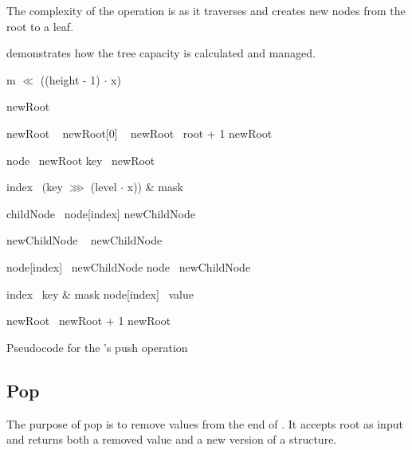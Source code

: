 The complexity of the operation is  as it traverses and creates new nodes from the root to a leaf.

 demonstrates how the tree capacity is calculated and managed.

\begin{listing}[ht!]
    \begin{algorithmic}[1]
		    \State \Return m $\ll$ ((height - 1) $\cdot$ x)
        \EndFunction

        \State
        
            \State newRoot \la\ \nil{}

                \State newRoot \la\ 
                \State newRoot[0] \la\ 
                \State newRoot \la\ root + 1
            \Else
                \State newRoot \la\ 
            \EndIf

            \State node \la\ newRoot
            \State key \la\ newRoot

                \State index \la\ (key $\ggg$ (level $\cdot$ x)) \& mask

                \State childNode \la\ node[index]
                \State newChildNode \la\ \nil{}

                    \State newChildNode \la\ 
                \Else
                    \State newChildNode \la\ 
                \EndIf

                \State node[index] \la\ newChildNode
                \State node \la\ newChildNode
            \EndFor

            \State index \la\ key \& mask
            \State node[index] \la\ value

            \State newRoot \la\ newRoot + 1
            \State \Return newRoot
        \EndFunction
    \end{algorithmic}

    \caption{Pseudocode for the \treerb{}'s push operation}
    \label{lst:rb-tree-push}
\end{listing}

\subsection{Pop}
The purpose of pop is to remove values from the end of \treerb{}. It accepts root as input and returns both a removed value and a new version of a structure.

